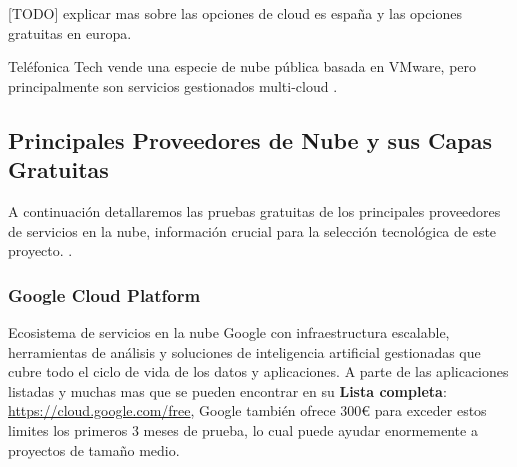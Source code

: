 [TODO] explicar mas sobre las opciones de cloud es españa y las opciones gratuitas en europa.

Teléfonica Tech vende una especie de nube pública basada en VMware, pero principalmente son servicios gestionados multi-cloud \citep{TelefonicaTechCloudPlatform}.

\subsection{Principales Proveedores de Nube y sus Capas Gratuitas}
\label{sec:cloud-free-tiers}

A continuación detallaremos las pruebas gratuitas de los principales proveedores de servicios en la nube, información crucial para la selección tecnológica de este proyecto. \citep{free-for-dev}.

\subsubsection*{Google Cloud Platform}

Ecosistema de servicios en la nube Google con infraestructura escalable, herramientas de análisis y soluciones de inteligencia artificial gestionadas que cubre todo el ciclo de vida de los datos y aplicaciones. A parte de las aplicaciones listadas y muchas mas que se pueden encontrar en su \textbf{Lista completa}: \url{https://cloud.google.com/free}, Google también ofrece 300€ para exceder estos limites los primeros 3 meses de prueba, lo cual puede ayudar enormemente a proyectos de tamaño medio.

